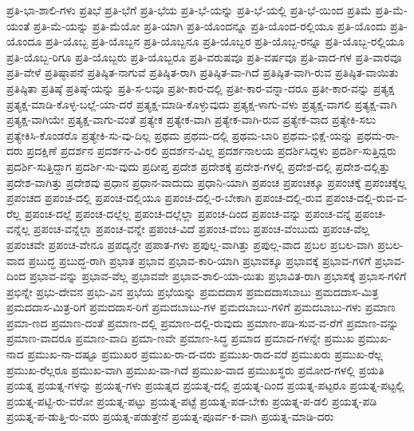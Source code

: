 {ಪ್ರತಿ-ಭಾ-ಶಾಲಿ-ಗಳು
ಪ್ರತಿಭೆ
ಪ್ರತಿ-ಭೆಗೆ
ಪ್ರತಿ-ಭೆಯ
ಪ್ರತಿ-ಭೆ-ಯನ್ನು
ಪ್ರತಿ-ಭೆ-ಯಲ್ಲಿ
ಪ್ರತಿ-ಭೆ-ಯಿಂದ
ಪ್ರತಿಮೆ
ಪ್ರತಿ-ಮೆ-ಯಂತೆ
ಪ್ರತಿ-ಮೆ-ಯನ್ನು
ಪ್ರತಿ-ಮೆಯೋ
ಪ್ರತಿ-ಯಾಗಿ
ಪ್ರತಿ-ಯೊಂದನ್ನೂ
ಪ್ರತಿ-ಯೊಂದ-ರಲ್ಲಿಯೂ
ಪ್ರತಿ-ಯೊಂದು
ಪ್ರತಿ-ಯೊಂದೂ
ಪ್ರತಿ-ಯೊಬ್ಬ
ಪ್ರತಿ-ಯೊಬ್ಬನ
ಪ್ರತಿ-ಯೊಬ್ಬನೂ
ಪ್ರತಿ-ಯೊಬ್ಬರ
ಪ್ರತಿ-ಯೊಬ್ಬ-ರನ್ನೂ
ಪ್ರತಿ-ಯೊಬ್ಬ-ರಲ್ಲಿಯೂ
ಪ್ರತಿ-ಯೊಬ್ಬ-ರಿಗೂ
ಪ್ರತಿ-ಯೊಬ್ಬರು
ಪ್ರತಿ-ಯೊಬ್ಬರೂ
ಪ್ರತಿ-ವರುಷವೂ
ಪ್ರತಿ-ವರ್ಷವೂ
ಪ್ರತಿ-ವಾದ-ಗಳ
ಪ್ರತಿ-ವಾರವೂ
ಪ್ರತಿ-ವೇಳೆ
ಪ್ರತಿಷ್ಠಾಪನೆ
ಪ್ರತಿಷ್ಠಿತ-ನಾಗುವೆ
ಪ್ರತಿಷ್ಠಿತ-ರಾಗಿ
ಪ್ರತಿಷ್ಠಿತ-ವಾ-ಗಿದೆ
ಪ್ರತಿಷ್ಠಿತ-ವಾಗಿ-ರುವ
ಪ್ರತಿಷ್ಠಿತ-ವಾಯಿತು
ಪ್ರತಿಷ್ಠಿತಾ
ಪ್ರತಿಷ್ಠೆ
ಪ್ರತಿಷ್ಠೆ-ಯನ್ನು
ಪ್ರತಿ-ಸ-ಲವೂ
ಪ್ರತೀ-ಕಾರ-ದಲ್ಲಿ
ಪ್ರತೀ-ಕಾರ-ವನ್ನಾ-ದರೂ
ಪ್ರತೀ-ಕಾರ-ವನ್ನು
ಪ್ರತ್ಯಕ್ಷ
ಪ್ರತ್ಯಕ್ಷ-ಮಾಡಿ-ಕೊಳ್ಳ-ಬಲ್ಲೆ-ಯಾ-ದರೆ
ಪ್ರತ್ಯಕ್ಷ-ಮಾಡಿ-ಕೊಳ್ಳುವುದು
ಪ್ರತ್ಯಕ್ಷ-ಳಾಗು-ವಳು
ಪ್ರತ್ಯಕ್ಷ-ವಾಗಲಿ
ಪ್ರತ್ಯಕ್ಷ-ವಾಗಿ
ಪ್ರತ್ಯಕ್ಷ-ವಾಗಿಯೇ
ಪ್ರತ್ಯಕ್ಷ-ವಾಗು-ವಂತೆ
ಪ್ರತ್ಯೇಕ
ಪ್ರತ್ಯೇಕ-ವಾಗಿ
ಪ್ರತ್ಯೇಕ-ವಾಗಿ-ರುವ
ಪ್ರತ್ಯೇಕ-ವಾದ
ಪ್ರತ್ಯೇಕಿ-ಸಲು
ಪ್ರತ್ಯೇಕಿಸಿ-ಕೊಂಡರೊ
ಪ್ರತ್ಯೇಕಿ-ಸು-ವು-ದಿಲ್ಲ
ಪ್ರಥಮ
ಪ್ರಥಮ-ದಲ್ಲಿ
ಪ್ರಥಮ-ಬಾರಿ
ಪ್ರಥಮ-ಭಿಕ್ಷೆ-ಯನ್ನು
ಪ್ರಥಮ-ರಾ-ದರು
ಪ್ರದಕ್ಷಿಣೆ
ಪ್ರದರ್ಶನ
ಪ್ರದರ್ಶನ-ವಿ-ರಲಿ
ಪ್ರದರ್ಶನ-ವಿಲ್ಲ
ಪ್ರದರ್ಶನಾಲಯ
ಪ್ರದರ್ಶಿಸಿದ್ದಳು
ಪ್ರದರ್ಶಿ-ಸುತ್ತಿದ್ದರು
ಪ್ರದರ್ಶಿ-ಸುತ್ತಿದ್ದಾಗ
ಪ್ರದರ್ಶಿ-ಸು-ವುದು
ಪ್ರದೀಪ್ತ
ಪ್ರದೇಶ
ಪ್ರದೇಶಕ್ಕೆ
ಪ್ರದೇಶ-ಗಳಲ್ಲಿ
ಪ್ರದೇಶ-ದಲ್ಲಿ
ಪ್ರದೇಶ-ದಲ್ಲಿತ್ತು
ಪ್ರದೇಶ-ವಾಗಿತ್ತು
ಪ್ರದೇಶವು
ಪ್ರಧಾನ
ಪ್ರಧಾನ-ವಾದುದು
ಪ್ರಧಾನಿ-ಯಾಗಿ
ಪ್ರಪಂಚ
ಪ್ರಪಂಚಕ್ಕೂ
ಪ್ರಪಂಚಕ್ಕೆ
ಪ್ರಪಂಚಕ್ಕೆಲ್ಲ
ಪ್ರಪಂಚದ
ಪ್ರಪಂಚ-ದಲ್ಲಿ
ಪ್ರಪಂಚ-ದಲ್ಲಿಯೂ
ಪ್ರಪಂಚ-ದಲ್ಲಿ-ರ-ಬೇಕಾಗಿ
ಪ್ರಪಂಚ-ದಲ್ಲಿ-ರುವ
ಪ್ರಪಂಚ-ದಲ್ಲಿ-ರುವ-ವ-ರೆಲ್ಲ
ಪ್ರಪಂಚ-ದಲ್ಲೆ
ಪ್ರಪಂಚ-ದಲ್ಲೆಲ್ಲ
ಪ್ರಪಂಚ-ದಲ್ಲೆಲ್ಲಾ
ಪ್ರಪಂಚ-ದಿಂದ
ಪ್ರಪಂಚ-ವನ್ನು
ಪ್ರಪಂಚ-ವನ್ನೆ
ಪ್ರಪಂಚ-ವನ್ನೆಲ್ಲ
ಪ್ರಪಂಚ-ವನ್ನೆಲ್ಲಾ
ಪ್ರಪಂಚ-ವನ್ನೇ
ಪ್ರಪಂಚ-ವಿದೆ
ಪ್ರಪಂಚ-ವೆಂಬ
ಪ್ರಪಂಚ-ವೆಂಬುದು
ಪ್ರಪಂಚ-ವೆಲ್ಲ
ಪ್ರಪಂಚವೇ
ಪ್ರಪಂಚ-ವೇನೂ
ಪ್ರಪದ್ಯನ್ತೇ
ಪ್ರಪಾತ-ಗಳು
ಪ್ರಪುಲ್ಲ-ವಾಗಿತ್ತು
ಪ್ರಪುಲ್ಲ-ವಾದ
ಪ್ರಬಲ
ಪ್ರಬಲ-ವಾಗಿ
ಪ್ರಬಲ-ವಾದ
ಪ್ರಬುದ್ಧ
ಪ್ರಬುದ್ಧ-ರಾಗಿ
ಪ್ರಭಾತ
ಪ್ರಭಾವ
ಪ್ರಭಾವ-ಕಾರಿ-ಯಾಗಿ
ಪ್ರಭಾವಕ್ಕೂ
ಪ್ರಭಾವಕ್ಕೆ
ಪ್ರಭಾವ-ಗಳಿಗೆ
ಪ್ರಭಾವ-ದಿಂದ
ಪ್ರಭಾವ-ವನ್ನು
ಪ್ರಭಾವ-ವೆಲ್ಲ
ಪ್ರಭಾವವೇ
ಪ್ರಭಾವ-ಶಾಲಿ-ಯಾ-ಯಿತು
ಪ್ರಭಾವಿತ-ರಾಗಿ
ಪ್ರಭಾಸಕ್ಕೆ
ಪ್ರಭಾಸ-ಗಳಿಗೆ
ಪ್ರಭಿನ್ನೇ
ಪ್ರಭು-ದೇವನ
ಪ್ರಭು-ವಿನ
ಪ್ರಭೆಯ
ಪ್ರಭೆಯನ್ನು
ಪ್ರಮದದಾಸ
ಪ್ರಮದದಾಸಬಾಬು
ಪ್ರಮದದಾಸ-ಮಿತ್ರ
ಪ್ರಮದದಾಸ-ಮಿತ್ರ-ರಿಗೆ
ಪ್ರಮದದಾಸ-ರಿಗೆ
ಪ್ರಮದಬಾಬು-ಗಳ
ಪ್ರಮದಬಾಬು-ಗಳಿಗೆ
ಪ್ರಮದಬಾಬು-ಗಳು
ಪ್ರಮಾಣ
ಪ್ರಮಾ-ಣದ
ಪ್ರಮಾಣ-ದಂತೆ
ಪ್ರಮಾಣ-ದಲ್ಲಿ
ಪ್ರಮಾಣ-ದಲ್ಲಿ-ರುವುದು
ಪ್ರಮಾಣ-ಪಡಿ-ಸುವ-ವ-ರೆಗೆ
ಪ್ರಮಾಣ-ವನ್ನು
ಪ್ರಮಾಣ-ವಾದರೂ
ಪ್ರಮಾಣ-ವಾದಿ
ಪ್ರಮಾ-ಣವೇ
ಪ್ರಮಾಣ-ಸಿದ್ಧ
ಪ್ರಮಾದ
ಪ್ರಮಾದ-ಗಳನ್ನೇ
ಪ್ರಮುಖ
ಪ್ರಮುಖ-ನಾದ
ಪ್ರಮುಖ-ನಾ-ದಷ್ಟೂ
ಪ್ರಮುಖರ
ಪ್ರಮುಖ-ರಾ-ದ-ವರು
ಪ್ರಮುಖ-ರಾದ-ವರೆ
ಪ್ರಮುಖರು
ಪ್ರಮುಖ-ರೆಲ್ಲ
ಪ್ರಮುಖ-ರೆಲ್ಲರೂ
ಪ್ರಮುಖ-ವಾಗಿ
ಪ್ರಮುಖ-ವಾ-ಗಿದೆ
ಪ್ರಮುಖ-ವಾದ
ಪ್ರಮುಖಸ್ಥರು
ಪ್ರಮೋದ-ಗಳಲ್ಲಿ
ಪ್ರಯತಿ
ಪ್ರಯತ್ನ
ಪ್ರಯತ್ನ-ಗಳನ್ನು
ಪ್ರಯತ್ನ-ಗಳು
ಪ್ರಯತ್ನದ
ಪ್ರಯತ್ನ-ದಲ್ಲಿ
ಪ್ರಯತ್ನ-ದಿಂದ
ಪ್ರಯತ್ನ-ಪಟ್ಟರೂ
ಪ್ರಯತ್ನ-ಪಟ್ಟಲ್ಲಿ
ಪ್ರಯತ್ನ-ಪಟ್ಟಿ-ರು-ವರೋ
ಪ್ರಯತ್ನ-ಪಟ್ಟು
ಪ್ರಯತ್ನ-ಪಟ್ಟೆ
ಪ್ರಯತ್ನ-ಪಡ-ಬೇಕು
ಪ್ರಯತ್ನ-ಪ-ಡಲಿ
ಪ್ರಯತ್ನ-ಪಡಿ
ಪ್ರಯತ್ನ-ಪ-ಡುತ್ತಿ-ರು-ವರು
ಪ್ರಯತ್ನ-ಪಡುತ್ತೇನೆ
ಪ್ರಯತ್ನ-ಪೂರ್ವ-ಕ-ವಾಗಿ
ಪ್ರಯತ್ನ-ಮಾಡಿ-ದರು
}
